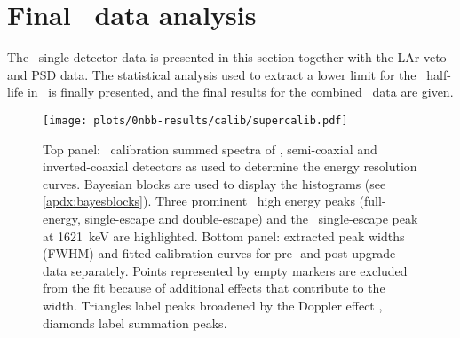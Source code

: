 \section{Final \gerda\ data analysis}%
\label{sec:gerda:ana}

The \phasetwo\ single-detector data is presented in this section together with the LAr
veto and PSD data.  The statistical analysis used to extract a lower limit for the \onbb\
half-life in \gesix\ is finally presented, and the final results for the combined \gerda\
data are given.

\begin{figure}
  \centering
  \texttt{[image: plots/0nbb-results/calib/supercalib.pdf]}
  \caption{%
    Top panel: \Th\ calibration summed spectra of \bege, semi-coaxial and inverted-coaxial
    detectors as used to determine the energy resolution curves. Bayesian blocks are used
    to display the histograms (see \cref{apdx:bayesblocks}). Three prominent \Tl\ high
    energy peaks (full-energy, single-escape and double-escape) and the \Bil\
    single-escape peak at 1621~keV are highlighted. Bottom panel: extracted peak widths
    (FWHM) and fitted calibration curves for pre- and post-upgrade data separately. Points
    represented by empty markers are excluded from the fit because of additional effects
    that contribute to the width. Triangles label peaks broadened by the Doppler effect
    \fillme{ref?}, diamonds label summation peaks.
  }\label{fig:gerda:calib-desc}
\end{figure}

